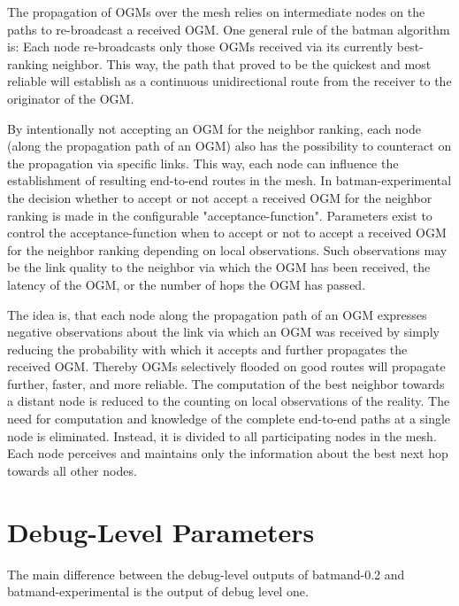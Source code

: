 \documentclass[11pt]{article}
\begin{document}
The propagation of OGMs over the mesh relies on intermediate nodes on the paths to re-broadcast a received OGM.
%
One general rule of the batman algorithm is:
Each node re-broadcasts only those OGMs received via its currently best-ranking neighbor.
%
%
%
This way, the path that proved to be the quickest and most reliable will establish as a continuous unidirectional route from the receiver to the originator of the OGM.


%
By intentionally not accepting an OGM for the neighbor ranking, each node (along the propagation path of an OGM) also has the possibility to counteract on the propagation via specific links.
This way, each node can influence the establishment of resulting end-to-end routes in the mesh.
%
In batman-experimental the decision whether to accept or not accept a received OGM for the neighbor ranking is made in the configurable "acceptance-function".
%
Parameters exist to control the acceptance-function when to accept or not to accept a received OGM for the neighbor ranking depending on local observations.
%
Such observations may be the link quality to the neighbor via which the OGM has been received, the latency of the OGM, or the number of hops the OGM has passed.

The idea is, that each node along the propagation path of an OGM expresses negative observations about the link via which an OGM was received by simply reducing the probability with which it accepts and further propagates the received OGM.
%
Thereby OGMs selectively flooded on good routes will propagate further, faster, and more reliable.
%
The computation of the best neighbor towards a distant node is reduced to the counting on local observations of the reality.
%
The need for computation and knowledge of the complete end-to-end paths at a single node is eliminated.
%
Instead, it is divided to all participating nodes in the mesh. Each node perceives and maintains only the information about the best next hop towards all other nodes.




\section{Debug-Level Parameters}
\label{sec:debug-levels}
The main difference between the debug-level outputs of batmand-0.2 and batmand-experimental is the output of debug level one.
\end{document}
